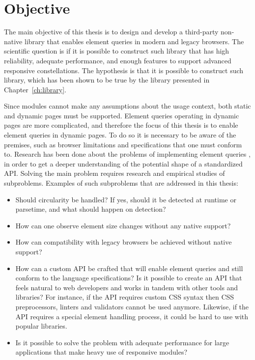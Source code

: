 \documentclass[a4paper,11pt]{kth-mag}
\begin{document}
    \section{Objective}
      The main objective of this thesis is to design and develop a \gls{third-party} non-\gls{native} library that enables element queries in modern and legacy \glspl{browser}.
      The scientific question is if it is possible to construct such library that has high reliability, adequate performance, and enough features to support advanced responsive constellations.
      The hypothesis is that it is possible to construct such library, which has been shown to be true by the library presented in Chapter~\ref{ch:library}.

      Since modules cannot make any assumptions about the usage context, both static and dynamic pages must be supported.
      Element queries operating in dynamic pages are more complicated, and therefore the focus of this thesis is to enable element queries in dynamic pages.
      To do so it is necessary to be aware of the premises, such as \gls{browser} limitations and specifications that one must conform to.
      Research has been done about the problems of implementing element queries , in order to get a deeper understanding of the potential shape of a standardized \gls{API}.
      Solving the main problem requires research and empirical studies of subproblems.
      Examples of such subproblems that are addressed in this thesis:
      \begin{itemize}
        \item Should circularity be handled? If yes, should it be detected at runtime or parsetime, and what should happen on detection?
        \item How can one observe \gls{element} size changes without any \gls{native} support?
        \item How can compatibility with legacy \glspl{browser} be achieved without \gls{native} support?
        \item
          How can a custom \gls{API} be crafted that will enable element queries and still conform to the language specifications? Is it possible to create an \gls{API} that feels natural to \gls{web} developers and works in tandem with other tools and libraries?
          For instance, if the \gls{API} requires custom \gls{CSS} syntax then \gls{CSS} preprocessors, linters and validators cannot be used anymore.
          Likewise, if the \gls{API} requires a special \gls{element} handling process, it could be hard to use with popular libraries. 
        \item Is it possible to solve the problem with adequate performance for large applications that make heavy use of \gls{responsive} modules?
      \end{itemize}
\end{document}
